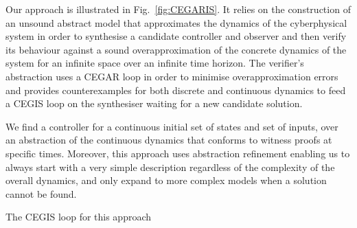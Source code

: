 \documentclass[sigconf]{llncs}
\begin{document}
Our approach is illustrated in Fig.~\ref{fig:CEGARIS}. It relies on the
construction of an unsound abstract model that approximates the dynamics
of the cyberphysical system in order to synthesise a candidate controller
and observer and then verify its behaviour against a sound overapproximation
of the concrete dynamics of the system for an infinite space over an infinite
time horizon.
The verifier's abstraction uses a CEGAR loop in order to minimise 
overapproximation errors and provides counterexamples for both
discrete and continuous dynamics to feed a CEGIS loop on the synthesiser
waiting for a new candidate solution. 

We find a controller for a continuous initial set of states and set of inputs,
over an abstraction of the continuous dynamics \cite{cattaruzza2015unbounded}
that conforms to witness proofs at specific times.
Moreover, this approach uses abstraction refinement enabling us to always
start with a very simple description regardless of the complexity of the
overall dynamics, and only expand to more complex models when a solution
cannot be found.

The CEGIS loop for this approach 
\end{document}
